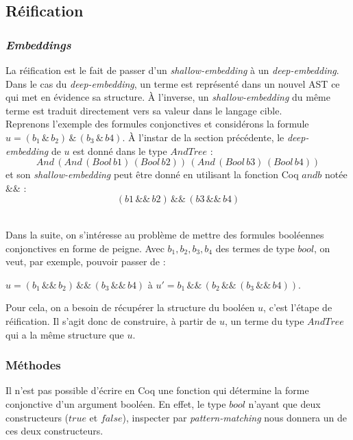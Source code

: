 \documentclass[11pt]{article}
\begin{document}
\subsection{Réification}

\subsubsection{\textit{Embeddings}}

La réification est le fait de passer d'un \textit{shallow-embedding} à un \textit{deep-embedding}. \\

Dans le cas du \textit{deep-embedding}, un terme est représenté dans un nouvel AST ce qui met en évidence sa structure. À l'inverse, un \textit{shallow-embedding} du même terme est traduit directement vers sa valeur dans le langage cible. \\

Reprenons l'exemple des formules conjonctives et considérons la formule $ u = (b_1 \,\&\, b_2) \,\&\, (b_3 \,\&\, b4)$. À l'instar de la section précédente, le \textit{deep-embedding} de $u$ est donné dans le type $AndTree$ :
\[And\,(And\,(Bool\,b1)\,(Bool\,b2))\,(And\,(Bool\,b3)\,(Bool\,b4))\] 
et son \textit{shallow-embedding} peut être donné en utilisant la fonction Coq $andb$ notée $\&\&$ : 
\[(b1\,\&\&\,b2)\,\&\&\,(b3\,\&\&\,b4) \]\,

Dans la suite, on s'intéresse au problème de mettre des formules booléennes conjonctives en forme de peigne. Avec $b_1, b_2, b_3, b_4$ des termes de type $bool$, on veut, par exemple, pouvoir passer de : 
\begin{center}
$ u = (b_1 \,\&\&\, b_2) \,\&\&\, (b_3 \,\&\&\, b4)$ \hspace{1cm} à   \hspace{1cm}  $u' = b_1 \,\&\&\, (b_2 \,\&\&\, (b_3 \,\&\&\, b4)). $
\end{center}

Pour cela, on a besoin de récupérer la structure du booléen $u$, c'est l'étape de réification. Il s'agit donc de construire, à partir de $u$, un terme du type $AndTree$ qui a la même structure que $u$.

\subsubsection{Méthodes}
Il n'est pas possible d'écrire en Coq une fonction qui détermine la forme conjonctive d'un argument booléen. En effet, le type $bool$ n'ayant que deux constructeurs ($true$ et $false$), inspecter par \textit{pattern-matching} nous donnera un de ces deux constructeurs.\\
\end{document}
